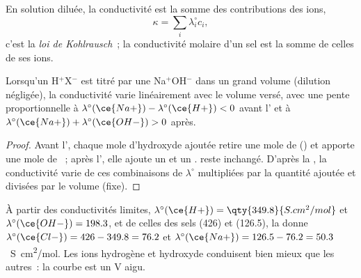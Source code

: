 \begin{proposition}\label{prop:b1:titration-methods:kohlrausch}
En solution diluée, la conductivité est la somme des contributions des
ions,
\[
  \kappa = \sum_i \lambda_i^\circ c_i ,
\]
c'est la \emph{loi de Kohlrausch}~; la
conductivité molaire d'un sel est la somme de celles de ses ions.
\end{proposition}


\begin{proposition}\label{prop:b1:titration-methods:conductimetric-slopes}
Lorsqu'un  H$^+$X$^-$ est titré par une 
Na$^+$OH$^-$ dans un grand volume (dilution négligée), la conductivité
varie linéairement avec le volume versé, avec une pente proportionnelle à
$\lambda^\circ(\ce{Na+}) - \lambda^\circ(\ce{H+}) < 0$ avant
l' et à $\lambda^\circ(\ce{Na+}) + \lambda^\circ(\ce{OH-}) > 0$
après.
\end{proposition}

\begin{proof}
Avant l', chaque mole d'hydroxyde ajoutée retire une mole de
 () et apporte une mole de ~; après
l', elle ajoute un  et un .  reste
inchangé. D'après la , la conductivité varie de ces
combinaisons de $\lambda^\circ$ multipliées par la quantité ajoutée et
divisées par le volume (fixe).
\end{proof}

À partir des conductivités limites, $\lambda^\circ(\ce{H+}) =
\qty{349.8}{S.cm^2/mol}$ et $\lambda^\circ(\ce{OH-}) = 198.3$, et de
celles des sels  (426) et  (126.5), la  donne
$\lambda^\circ(\ce{Cl-}) = 426 - 349.8 = 76.2$ et $\lambda^\circ(\ce{Na+}) =
126.5 - 76.2 = 50.3$~\unit{S.cm^2/mol}. Les ions hydrogène et hydroxyde
conduisent bien mieux que les autres~: la courbe est un V aigu.

